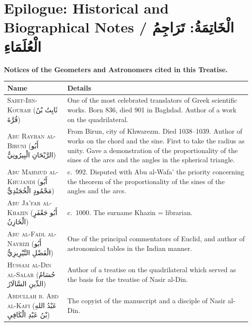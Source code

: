 \documentclass[11pt,a4paper]{article}
\theoremstyle{plain}
\theoremstyle{definition}
\theoremstyle{remark}
\newcommand{\ar}[1]{{\arabicfont\beginR #1\endR}}
\begin{document}
\clearpage

\section*{Epilogue: Historical and Biographical Notes / \ar{الْخَاتِمَةُ: تَرَاجِمُ الْعُلَمَاءِ}}
\label{sec:epilogue}

\noindent\textbf{Notices of the Geometers and Astronomers cited in this Treatise.}

\begin{center}
\begin{longtable}{lp{8cm}}
\toprule
\textbf{Name} & \textbf{Details} \\
\midrule
\endhead

\textsc{Sabit-Ibn-Kourah} (\ar{ثَابِتُ بْنُ قُرَّةَ}) & One of the most celebrated translators of Greek scientific works. Born 836, died 901 in Baghdad. Author of a work on the quadrilateral. \\
\addlinespace[0.15cm]

\textsc{Abu Rayhan al-Biruni} (\ar{أَبُو الرَّيْحَانِ الْبِيرُونِيُّ}) & From Birun, city of Khwarezm. Died 1038--1039. Author of works on the chord and the sine. First to take the radius as unity. Gave a demonstration of the proportionality of the sines of the arcs and the angles in the spherical triangle. \\
\addlinespace[0.15cm]

\textsc{Abu Mahmud al-Khujandi} (\ar{أَبُو مَحْمُودٍ الْخُجَنْدِيُّ}) & c.~992. Disputed with Abu al-Wafa' the priority concerning the theorem of the proportionality of the sines of the angles and the arcs. \\
\addlinespace[0.15cm]

\textsc{Abu Ja'far al-Khazin} (\ar{أَبُو جَعْفَرٍ الْخَازِنُ}) & c.~1000. The surname Khazin = librarian. \\
\addlinespace[0.15cm]

\textsc{Abu al-Fadl al-Nayrizi} (\ar{أَبُو الْفَضْلِ النَّيْرِيزِيُّ}) & One of the principal commentators of Euclid, and author of astronomical tables in the Indian manner. \\
\addlinespace[0.15cm]

\textsc{Hussam al-Din al-Salar} (\ar{حُسَامُ الدِّينِ السَّالَارُ}) & Author of a treatise on the quadrilateral which served as the basis for the treatise of Nasir al-Din. \\
\addlinespace[0.15cm]

\textsc{Abdullah b. Abd al-Kafi} (\ar{عَبْدُ اللهِ بْنُ عَبْدِ الْكَافِيِ}) & The copyist of the manuscript and a disciple of Nasir al-Din. \\

\bottomrule
\end{longtable}
\end{center}
\end{document}
